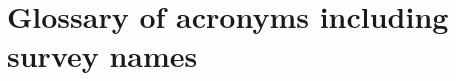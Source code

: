 \documentclass[a4paper,11pt]{article}
\begin{document}









\newpage

\appendix

\section{Glossary of acronyms including survey names}
\end{document}
